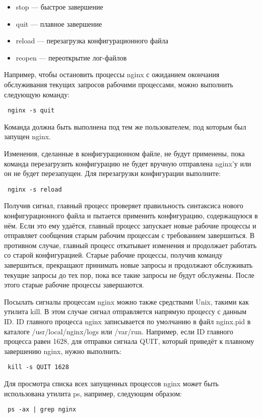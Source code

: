 \documentclass[a4paper,10pt,twoside]{article}
\begin{document}
\begin{itemize}
\item stop — быстрое завершение
\item quit — плавное завершение
\item reload — перезагрузка конфигурационного файла
\item reopen — переоткрытие лог-файлов
\end{itemize}

Например, чтобы остановить процессы nginx с ожиданием окончания обслуживания текущих запросов рабочими процессами, можно выполнить следующую команду:
\begin{verbatim}
 nginx -s quit
\end{verbatim} 
Команда должна быть выполнена под тем же пользователем, под которым был запущен nginx.

Изменения, сделанные в конфигурационном файле, не будут применены, пока команда перезагрузить конфигурацию не будет вручную отправлена nginx’у или он не будет перезапущен. Для перезагрузки конфигурации выполните:

\begin{verbatim}
 nginx -s reload
\end{verbatim} 
Получив сигнал, главный процесс проверяет правильность синтаксиса нового конфигурационного файла и пытается применить конфигурацию, содержащуюся в нём. Если это ему удаётся, главный процесс запускает новые рабочие процессы и отправляет сообщения старым рабочим процессам с требованием завершиться. В противном случае, главный процесс откатывает изменения и продолжает работать со старой конфигурацией. Старые рабочие процессы, получив команду завершиться, прекращают принимать новые запросы и продолжают обслуживать текущие запросы до тех пор, пока все такие запросы не будут обслужены. После этого старые рабочие процессы завершаются.

Посылать сигналы процессам nginx можно также средствами Unix, такими как утилита kill. В этом случае сигнал отправляется напрямую процессу с данным ID. ID главного процесса nginx записывается по умолчанию в файл nginx.pid в каталоге /usr/local/nginx/logs или /var/run. Например, если ID главного процесса равен 1628, для отправки сигнала QUIT, который приведёт к плавному завершению nginx, нужно выполнить:
\begin{verbatim}
 kill -s QUIT 1628
\end{verbatim} 

Для просмотра списка всех запущенных процессов nginx может быть использована утилита ps, например, следующим образом:
\begin{verbatim}
 ps -ax | grep nginx
\end{verbatim} 
\end{document}
